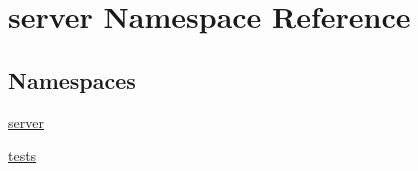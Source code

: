 \hypertarget{namespaceserver}{}\section{server Namespace Reference}
\label{namespaceserver}
\subsection*{Namespaces}
\begin{DoxyCompactItemize}
\item 
 \mbox{\hyperlink{namespaceserver_1_1server}{server}}
\item 
 \mbox{\hyperlink{namespaceserver_1_1tests}{tests}}
\end{DoxyCompactItemize}

